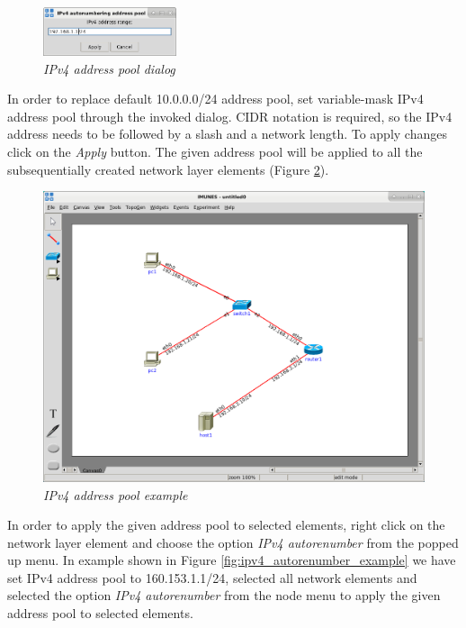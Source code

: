 \begin{figure}[H]
\centering
\vspace{10pt}
\includegraphics[width=0.35\textwidth]{./images/ipv4_addr_pool.png}
\caption{\emph{IPv4 address pool dialog}}
\label{fig:ipv4_addr_pool}
\end{figure}

In order to replace default 10.0.0.0/24 address pool, set variable-mask IPv4
address pool through the invoked dialog. CIDR notation is required, so the IPv4
address needs to be followed by a slash and a network length. To apply changes
click on the \emph{Apply} button. The given address pool will be applied to all
the subsequentially created network layer elements (Figure
\ref{fig:ipv4_addr_pool_example}).

\begin{figure}[H]
\centering
\vspace{10pt}
\includegraphics[width=\textwidth]{./images/ipv4_addr_pool_example.png}
\caption{\emph{IPv4 address pool example}}
\label{fig:ipv4_addr_pool_example}
\end{figure}

In order to apply the given address pool to selected elements, right click on
the network layer element and choose the option \emph{IPv4 autorenumber} from
the popped up menu. In example shown in Figure
\ref{fig:ipv4_autorenumber_example} we have set IPv4 address pool to
160.153.1.1/24, selected all network elements and selected the option
\emph{IPv4 autorenumber} from the node menu to apply the given address pool to
selected elements.

